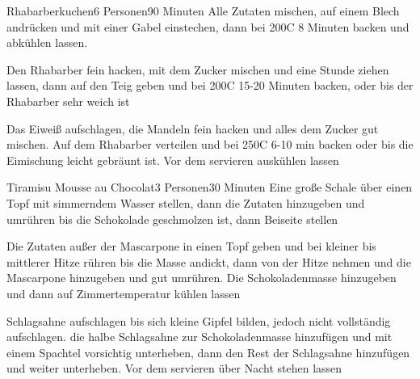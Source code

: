 
\begin{recipe}{Rhabarberkuchen}{6 Personen}{90 Minuten}
Alle Zutaten mischen, auf einem Blech andrücken und mit einer Gabel einstechen, dann bei 200\0C 8 Minuten backen und abkühlen lassen.

Den Rhabarber fein hacken, mit dem Zucker mischen und eine Stunde ziehen lassen, dann auf den Teig geben und bei 200\0C 15-20 Minuten backen, oder bis der Rhabarber sehr weich ist

Das Eiweiß aufschlagen, die Mandeln fein hacken und alles dem Zucker gut mischen.
Auf dem Rhabarber verteilen und bei 250\0C 6-10 min backen oder bis die Eimischung leicht gebräunt ist.
Vor dem servieren auskühlen lassen
\end{recipe}


\begin{recipe}{Tiramisu Mousse au Chocolat}{3 Personen}{30 Minuten}
Eine große Schale über einen Topf mit simmerndem Wasser stellen, dann die Zutaten hinzugeben und umrühren bis die Schokolade geschmolzen ist, dann Beiseite stellen

Die Zutaten außer der Mascarpone in einen Topf geben und bei kleiner bis mittlerer Hitze rühren bis die Masse andickt, dann von der Hitze nehmen und die Mascarpone hinzugeben und gut umrühren.
Die Schokoladenmasse hinzugeben und dann auf Zimmertemperatur kühlen lassen

Schlagsahne aufschlagen bis sich kleine Gipfel bilden, jedoch nicht vollständig aufschlagen.
die halbe Schlagsahne zur Schokoladenmasse hinzufügen und mit einem Spachtel vorsichtig unterheben, dann den Rest der Schlagsahne hinzufügen und weiter unterheben.
Vor dem servieren über Nacht stehen lassen
\end{recipe}


